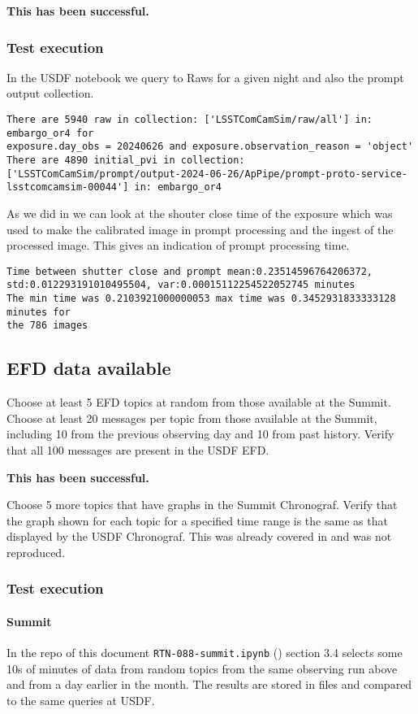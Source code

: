 \textbf{This has been successful.}
\subsubsection{Test execution}
In the USDF notebook we query to Raws for a given night and also the prompt output collection.

\begin{lstlisting}
There are 5940 raw in collection: ['LSSTComCamSim/raw/all'] in: embargo_or4 for
exposure.day_obs = 20240626 and exposure.observation_reason = 'object'
There are 4890 initial_pvi in collection:
['LSSTComCamSim/prompt/output-2024-06-26/ApPipe/prompt-proto-service-
lsstcomcamsim-00044'] in: embargo_or4
\end{lstlisting}

As we did in  we can look at the shouter close time of the exposure which was used to make the calibrated image in prompt processing and the ingest of the processed image.
This gives an indication of prompt processing time.
\begin{lstlisting}
Time between shutter close and prompt mean:0.23514596764206372,
std:0.012293191010495504, var:0.00015112254522052745 minutes
The min time was 0.2103921000000053 max time was 0.3452931833333128 minutes for
the 786 images
\end{lstlisting}


\subsection{EFD data available }
Choose at least 5 EFD topics at random from those available at the Summit.
Choose at least 20 messages per topic from those available at the Summit, including 10 from the previous observing day and 10 from past history.
Verify that all 100 messages are present in the USDF EFD.

\textbf{This has been successful.}

Choose 5 more topics that have graphs in the Summit Chronograf. Verify that the graph
shown for each topic for a specified time range is the same as that displayed by the USDF
Chronograf.
This was already covered in \cite{RTN-053} and was not reproduced.


\subsubsection{Test execution}

\paragraph{Summit} \label{sec:efdsummit}
In the repo of this document \texttt{RTN-088-summit.ipynb} ()  section 3.4
selects some 10s of minutes of data from random topics from the same observing run above and from a day earlier in the month.
The results are stored in files and compared to the same  queries at USDF.

